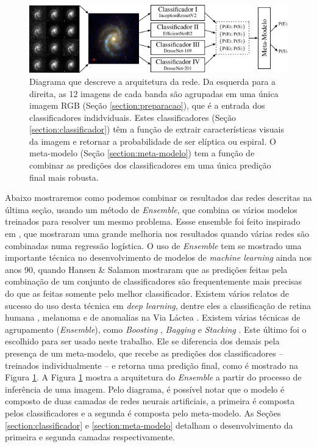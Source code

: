 \begin{figure}[!ht]
  \centering
  \includegraphics[width=\textwidth]{figures/arch.pdf}
  \caption{Diagrama que descreve a arquitetura da rede. Da esquerda para a direita, as 12 imagens de cada banda são agrupadas em uma única imagem RGB (Seção \ref{section:preparacao}), que é a entrada dos classificadores indidviduais. Estes classificadores (Seção \ref{section:classificador}) têm a função de extrair características visuais da imagem e retornar a probabilidade de ser elíptica ou espiral. O meta-modelo (Seção \ref{section:meta-modelo}) tem a função de combinar as predições dos classificadores em uma única predição final mais robusta.}
  \label{fig:arch}
\end{figure}

Abaixo mostraremos como podemos combinar os resultados das redes descritas na última seção, usando um método de  \emph{Ensemble}, que combina os vários modelos treinados para resolver um mesmo problema. Essse ensemble foi feito inspirado em \cite{Frayman2002}, que mostraram uma grande melhoria nos resultados quando várias redes são combinadas numa regressão logística. O uso de \emph{Ensemble} tem se mostrado uma importante técnica no desenvolvimento de modelos de \emph{machine learning} ainda nos anos 90, quando Hansen \& Salamon \cite{Hansen1990} mostraram que as predições feitas pela combinação de um conjunto de classificadores são frequentemente mais precisas do que as feitas somente pelo melhor classificador. Existem vários relatos de sucesso do uso desta técnica em \emph{deep learning}, dentre eles a classificação de retina humana \cite{EnsembleEx01}, melanoma \cite{EnsembleEx02} e de anomalias na Via Láctea \cite{EnsembleEx03}. Existem várias técnicas de agrupamento (\emph{Ensemble}), como \emph{Boosting} \cite{Kearns1989, Schapire1990}, \emph{Bagging} \cite{Breiman1996} e \emph{Stacking} \cite{Wolpert1992, Breiman1996b, Smyth1999}.
Este último foi o escolhido para ser usado neste trabalho. Ele se diferencia dos demais pela presença de um meta-modelo, que recebe as predições dos classificadores -- treinados individualmente -- e retorna uma predição final, como é mostrado na Figura \ref{fig:arch}.
A Figura \ref{fig:arch} mostra a arquitetura do \emph{Ensemble} a partir do processo de inferência de uma imagem. Pelo diagrama, é possível notar que o modelo é composto de duas camadas de redes neurais artificiais, a primeira é composta pelos classificadores e a segunda é composta pelo meta-modelo. As Seções \ref{section:classificador} e \ref{section:meta-modelo} detalham o desenvolvimento da primeira e segunda camadas respectivamente.


